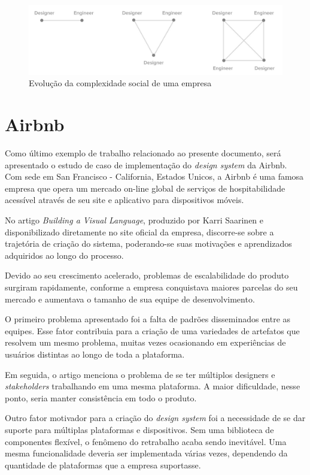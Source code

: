 \begin{figure}
	\includegraphics[width=\linewidth]{./04-figuras/03_trabalhos_relacionados/social-complexity.png}
    \caption{Evolução da complexidade social de uma empresa}
    \label{fig:socialComplexityIncrease}
\end{figure}

\section{Airbnb}

Como último exemplo de trabalho relacionado ao presente documento, será apresentado o estudo de caso de implementação do \textit{design system} da Airbnb. Com sede em San Francisco - California, Estados Unicos, a Airbnb é uma famosa empresa que opera um mercado on-line global de serviços de hospitabilidade acessível através de seu site e aplicativo para dispositivos móveis.

No artigo \textit{Building a Visual Language}, produzido por Karri Saarinen e disponibilizado diretamente no site oficial da empresa, discorre-se sobre a trajetória de criação do sistema, poderando-se suas motivações e aprendizados adquiridos ao longo do processo.

Devido ao seu crescimento acelerado, problemas de escalabilidade do produto surgiram rapidamente, conforme a empresa conquistava maiores parcelas do seu mercado e aumentava o tamanho de sua equipe de desenvolvimento.

O primeiro problema apresentado foi a falta de padrões disseminados entre as equipes. Esse fator contribuia para a criação de uma variedades de artefatos que resolvem um mesmo problema, muitas vezes ocasionando em experiências de usuários distintas ao longo de toda a plataforma.

Em seguida, o artigo menciona o problema de se ter múltiplos designers e \textit{stakeholders} trabalhando em uma mesma plataforma. A maior dificuldade, nesse ponto, seria manter consistência em todo o produto.

Outro fator motivador para a criação do \textit{design system} foi a necessidade de se dar suporte para múltiplas plataformas e dispositivos. Sem uma biblioteca de componentes flexível, o fenômeno do retrabalho acaba sendo inevitável. Uma mesma funcionalidade deveria ser implementada várias vezes, dependendo da quantidade de plataformas que a empresa suportasse.

